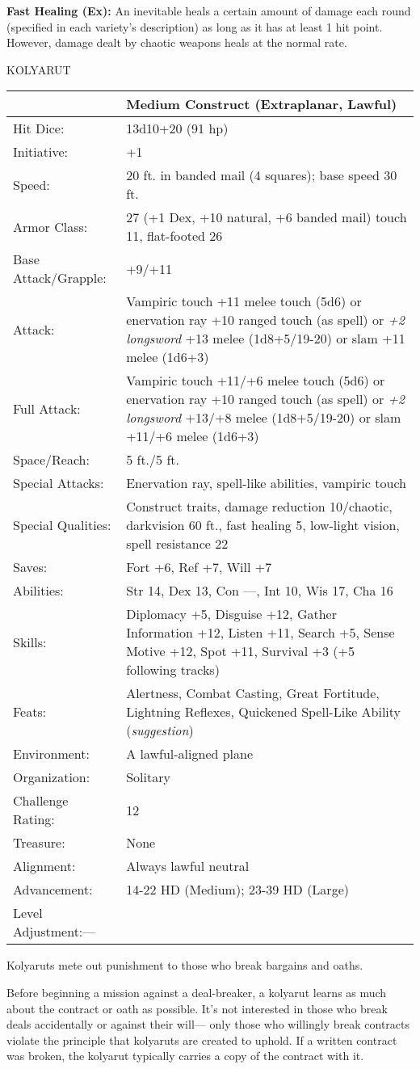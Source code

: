 \documentclass{article}
\begin{document}
\textbf{Fast Healing (Ex): }An inevitable heals a certain amount of damage each 
round (specified in each variety's description) as long as it has at least 1 hit 
point. However, damage dealt by chaotic weapons heals at the normal rate.

KOLYARUT

\begin{tabular}{|>{\raggedright}p{79pt}|>{\raggedright}p{246pt}|}
\hline
  & Medium Construct (Extraplanar, Lawful)\tabularnewline
\hline
Hit Dice: & 13d10+20 (91 hp)\tabularnewline
\hline
Initiative: & +1\tabularnewline
\hline
Speed: & 20 ft. in banded mail (4 squares); base speed 30 ft.\tabularnewline
\hline
Armor Class: & 27 (+1 Dex, +10 natural, +6 banded mail) touch 11, flat-footed 26\tabularnewline
\hline
Base Attack/Grapple: & +9/+11\tabularnewline
\hline
Attack: & Vampiric touch +11 melee touch (5d6) or enervation ray +10 ranged touch 
(as spell) or \textit{+2 longsword }+13 melee (1d8+5/19-20) or slam +11 melee (1d6+3)\tabularnewline
\hline
Full Attack: & Vampiric touch +11/+6 melee touch (5d6) or enervation ray +10 ranged 
touch (as spell) or \textit{+2 longsword }+13/+8 melee (1d8+5/19-20) or slam +11/+6 
melee (1d6+3)\tabularnewline
\hline
Space/Reach: & 5 ft./5 ft.\tabularnewline
\hline
Special Attacks: & Enervation ray, spell-like abilities, vampiric touch\tabularnewline
\hline
Special Qualities: & Construct traits, damage reduction 10/chaotic, darkvision 
60 ft., fast healing 5, low-light vision, spell resistance 22\tabularnewline
\hline
Saves: & Fort +6, Ref +7, Will +7\tabularnewline
\hline
Abilities: & Str 14, Dex 13, Con ---, Int 10, Wis 17, Cha 16\tabularnewline
\hline
Skills: & Diplomacy +5, Disguise +12, Gather Information +12, Listen +11, Search 
+5, Sense Motive +12, Spot +11, Survival +3 (+5 following tracks)\tabularnewline
\hline
Feats: & Alertness, Combat Casting, Great Fortitude, Lightning Reflexes, Quickened 
Spell-Like Ability (\textit{suggestion})\tabularnewline
\hline
Environment: & A lawful-aligned plane\tabularnewline
\hline
Organization: & Solitary\tabularnewline
\hline
Challenge Rating: & 12\tabularnewline
\hline
Treasure: & None\tabularnewline
\hline
Alignment: & Always lawful neutral\tabularnewline
\hline
Advancement: & 14-22 HD (Medium); 23-39 HD (Large)\tabularnewline
\hline
Level Adjustment:--- & \tabularnewline
\hline
\end{tabular}

Kolyaruts mete out punishment to those who break bargains and oaths. 

Before beginning a mission against a deal-breaker, a kolyarut learns as much about 
the contract or oath as possible. It's not interested in those who break deals 
accidentally or against their will--- only those who willingly break contracts 
violate the principle that kolyaruts are created to uphold. If a written contract 
was broken, the kolyarut typically carries a copy of the contract with it.
\end{document}
